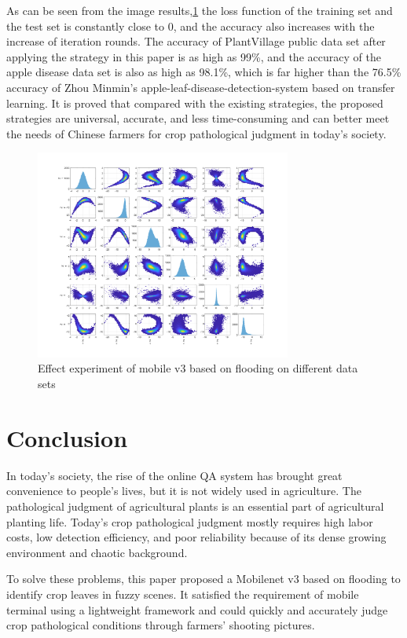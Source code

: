 \documentclass[a4paper,fleqn]{cas-sc}
\begin{document}
As can be seen from the image results,\ref{fig:f9} the loss function of the training set and the test set is constantly close to 0, and the accuracy also increases with the increase of iteration rounds. The accuracy of PlantVillage public data set after applying the strategy in this paper is as high as 99\%, and the accuracy of the apple disease data set is also as high as 98.1\%, which is far higher than the 76.5\% accuracy of Zhou Minmin's apple-leaf-disease-detection-system based on transfer learning.\cite{ZhouMing} It is proved that compared with the existing strategies, the proposed strategies are universal, accurate, and less time-consuming and can better meet the needs of Chinese farmers for crop pathological judgment in today's society.
\begin{figure}
\centering
\includegraphics[width=0.75\textwidth]{figs/f9.png}
\caption{Effect experiment of mobile v3 based on flooding on different data sets}
\label{fig:f9}
\end{figure}

\section{Conclusion}
In today's society, the rise of the online QA system has brought great convenience to people's lives, but it is not widely used in agriculture. The pathological judgment of agricultural plants is an essential part of agricultural planting life. Today's crop pathological judgment mostly requires high labor costs, low detection efficiency, and poor reliability because of its dense growing environment and chaotic background. 

To solve these problems, this paper proposed a Mobilenet v3 based on flooding to identify crop leaves in fuzzy scenes. It satisfied the requirement of mobile terminal using a lightweight framework and could quickly and accurately judge crop pathological conditions through farmers' shooting pictures. 
\end{document}
